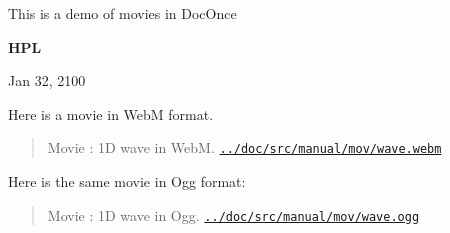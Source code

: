 \documentclass[%
oneside,                 %
final,                   %
10pt]{article}
\newenvironment{doconce:movie}{}{}
\newcounter{doconce:movie:counter}
\begin{document}

\newcommand{\exercisesection}[1]{\subsection*{#1}}








\thispagestyle{empty}

\begin{center}
{\LARGE\bf
\begin{spacing}{1.25}
This is a demo of movies in DocOnce
\end{spacing}
}
\end{center}


\begin{center}
{\bf HPL${}^{}$} \\ [0mm]
\end{center}

\begin{center}
\end{center}
    

\begin{center}
Jan 32, 2100
\end{center}

\vspace{1cm}


Here is a movie in WebM format.


\begin{doconce:movie}
\begin{quote}
Movie : 1D wave in WebM. \href{run:../doc/src/manual/mov/wave.webm}{\nolinkurl{../doc/src/manual/mov/wave.webm}}
\end{quote}
\end{doconce:movie}


Here is the same movie in Ogg format:


\begin{doconce:movie}
\begin{quote}
Movie : 1D wave in Ogg. \href{run:../doc/src/manual/mov/wave.ogg}{\nolinkurl{../doc/src/manual/mov/wave.ogg}}
\end{quote}
\end{doconce:movie}
\end{document}
